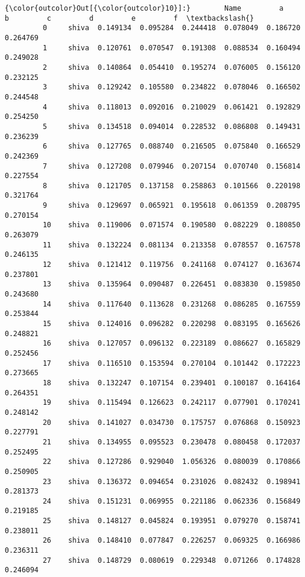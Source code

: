 \documentclass[11pt]{article}
\begin{document}
\begin{Verbatim}[commandchars=\\\{\}]
{\color{outcolor}Out[{\color{outcolor}10}]:}        Name         a         b         c         d         e         f  \textbackslash{}
         0     shiva  0.149134  0.095284  0.244418  0.078049  0.186720  0.264769   
         1     shiva  0.120761  0.070547  0.191308  0.088534  0.160494  0.249028   
         2     shiva  0.140864  0.054410  0.195274  0.076005  0.156120  0.232125   
         3     shiva  0.129242  0.105580  0.234822  0.078046  0.166502  0.244548   
         4     shiva  0.118013  0.092016  0.210029  0.061421  0.192829  0.254250   
         5     shiva  0.134518  0.094014  0.228532  0.086808  0.149431  0.236239   
         6     shiva  0.127765  0.088740  0.216505  0.075840  0.166529  0.242369   
         7     shiva  0.127208  0.079946  0.207154  0.070740  0.156814  0.227554   
         8     shiva  0.121705  0.137158  0.258863  0.101566  0.220198  0.321764   
         9     shiva  0.129697  0.065921  0.195618  0.061359  0.208795  0.270154   
         10    shiva  0.119006  0.071574  0.190580  0.082229  0.180850  0.263079   
         11    shiva  0.132224  0.081134  0.213358  0.078557  0.167578  0.246135   
         12    shiva  0.121412  0.119756  0.241168  0.074127  0.163674  0.237801   
         13    shiva  0.135964  0.090487  0.226451  0.083830  0.159850  0.243680   
         14    shiva  0.117640  0.113628  0.231268  0.086285  0.167559  0.253844   
         15    shiva  0.124016  0.096282  0.220298  0.083195  0.165626  0.248821   
         16    shiva  0.127057  0.096132  0.223189  0.086627  0.165829  0.252456   
         17    shiva  0.116510  0.153594  0.270104  0.101442  0.172223  0.273665   
         18    shiva  0.132247  0.107154  0.239401  0.100187  0.164164  0.264351   
         19    shiva  0.115494  0.126623  0.242117  0.077901  0.170241  0.248142   
         20    shiva  0.141027  0.034730  0.175757  0.076868  0.150923  0.227791   
         21    shiva  0.134955  0.095523  0.230478  0.080458  0.172037  0.252495   
         22    shiva  0.127286  0.929040  1.056326  0.080039  0.170866  0.250905   
         23    shiva  0.136372  0.094654  0.231026  0.082432  0.198941  0.281373   
         24    shiva  0.151231  0.069955  0.221186  0.062336  0.156849  0.219185   
         25    shiva  0.148127  0.045824  0.193951  0.079270  0.158741  0.238011   
         26    shiva  0.148410  0.077847  0.226257  0.069325  0.166986  0.236311   
         27    shiva  0.148729  0.080619  0.229348  0.071266  0.174828  0.246094   

\end{Verbatim}
\end{document}
